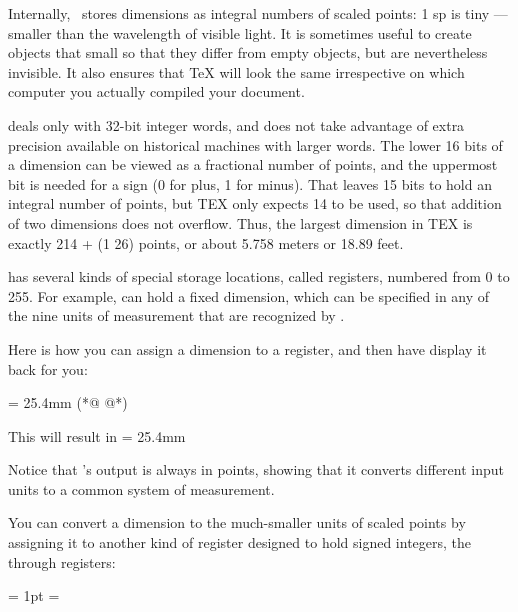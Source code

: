 Internally, \tex\ stores dimensions as integral numbers of scaled points:
1 sp is tiny ---  smaller than the wavelength of visible light. It is sometimes
useful to create objects that small so that they differ from empty objects,
but are nevertheless invisible. It also ensures that TeX will look the same irrespective on which computer you actually compiled your document.

\tex deals only with 32-bit integer words, and does not take advantage
of extra precision available on historical machines with larger words. The
lower 16 bits of a dimension can be viewed as a fractional number of points,
and the uppermost bit is needed for a sign (0 for plus, 1 for minus). That
leaves 15 bits to hold an integral number of points, but TEX only expects 14
to be used, so that addition of two dimensions does not overflow. Thus, the
largest dimension in TEX is exactly 214 + (1 26) points, or about 5.758  
meters or 18.89 feet.

\tex has several kinds of special storage locations, called registers, numbered
from 0 to 255. For example,  can hold a fixed dimension,
which can be specified in any of the nine units of measurement that are
recognized by \tex.

Here is how you can assign a dimension to a register, and then have \tex
display it back for you:

\begin{teX}
 = 25.4mm (*@\protect{}  @*)
\the{}
\end{teX}

This will result in
 = 25.4mm



Notice that \tex’s output is always in points, showing that it converts different
input units to a common system of measurement.

You can convert a dimension to the much-smaller units of scaled points
by assigning it to another kind of \tex register designed to hold signed integers,
the  through  registers:

\begin{teX}
 = 1pt
 = 
\the{}
\end{teX}

